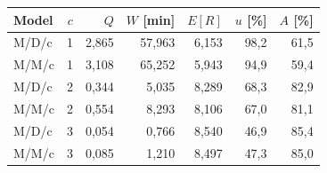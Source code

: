 \begin{tabular}{lrrrrrr}
\toprule
Model & $c$ & $Q$ & $W$ [min] & $E[R]$ & $u$ [\%] & $A$ [\%] \\
\midrule
M/D/c & 1 & 2,865 & 57,963 & 6,153 & 98,2 & 61,5 \\
M/M/c & 1 & 3,108 & 65,252 & 5,943 & 94,9 & 59,4 \\
M/D/c & 2 & 0,344 & 5,035 & 8,289 & 68,3 & 82,9 \\
M/M/c & 2 & 0,554 & 8,293 & 8,106 & 67,0 & 81,1 \\
M/D/c & 3 & 0,054 & 0,766 & 8,540 & 46,9 & 85,4 \\
M/M/c & 3 & 0,085 & 1,210 & 8,497 & 47,3 & 85,0 \\
\bottomrule
\end{tabular}
